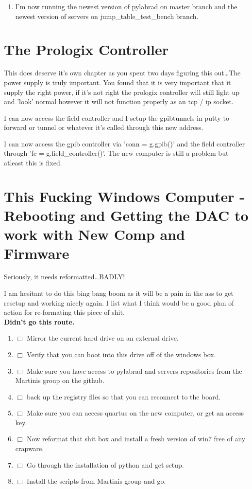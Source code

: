 \documentclass[10pt]{book}
\begin{document}
{\begin{enumerate}
    \item I'm now running the newest version of pylabrad on master branch and the newest version of servers on jump\_table\_test\_bench branch.
\end{enumerate}


\chapter{The Prologix Controller}

This does deserve it's own chapter as you spent two days figuring this out\ldots The power supply is truly important. You found that it is very important that it supply the right power, if it's not right the prologix controller will still light up and 'look' normal however it will not function properly as an tcp / ip socket.

I can now access the field controller and I setup the gpibtunnels in putty to forward or tunnel or whatever it's called through this new address. 

I can now access the gpib controller via 'conn = g.gpib()' and the field controller through 'fc = g.field\_controller()'. The new computer is still a problem but atleast this is fixed.


\chapter{This Fucking Windows Computer - Rebooting and Getting the DAC to work with New Comp and Firmware}
Seriously, it needs reformatted\ldots BADLY! 

I am hesitant to do this bing bang boom as it will be a pain in the ass to get resetup and working nicely again. I list what I think would be a good plan of action for re-formating this piece of shit.\\

{\bf Didn't go this route.}

\begin{enumerate}
    \item $\Box$ Mirror the current hard drive on an external drive.
    \item $\Box$ Verify that you can boot into this drive off of the windows box.
    \item $\Box$ Make sure you have access to pylabrad and servers repositories from the Martinis group on the github. 
    \item $\Box$ back up the registry files so that you can reconnect to the board.
    \item $\Box$ Make sure you can access quartus on the new computer, or get an access key.
    \item $\Box$ Now reformat that shit box and install a fresh version of win7 free of any crapware.
    \item $\Box$ Go through the installation of python and get setup.
    \item $\Box$ Install the scripts from Martinis group and go.\\
\end{enumerate}

}
\end{document}
